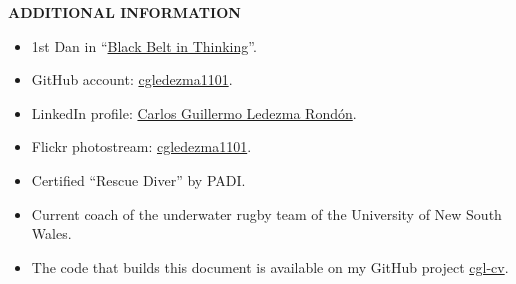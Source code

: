 \documentclass[10pt]{article}
\begin{document}
\vspace{6mm}

\textbf{\uppercase{Additional information}}

\begin{itemize}
	\item 1st Dan in ``\href{http://www.blackbeltinthinking.com/}{Black Belt in Thinking}''.
	\item GitHub account: \href{https://github.com/cgledezma1101}{cgledezma1101}.
	\item LinkedIn profile: \href{https://au.linkedin.com/in/cgledezma}{Carlos Guillermo Ledezma Rondón}.
	\item Flickr photostream: \href{https://www.flickr.com/photos/154505494@N07/}{cgledezma1101}.
	\item Certified ``Rescue Diver'' by PADI.
	\item Current coach of the underwater rugby team of the University of New South Wales.
	\item The code that builds this document is available on my GitHub project \href{https://github.com/cgledezma1101/cgl-cv}{cgl-cv}.
\end{itemize}
\end{document}
